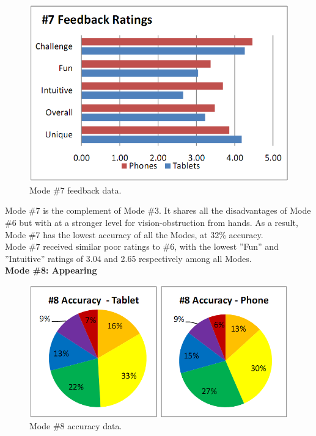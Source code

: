 \documentclass{sig-alternate}
\begin{document}
\begin{figure}[htb!]
	\begin{center}
		\includegraphics[width=1\linewidth]{figure_chart_rating_7}
	\end{center}
	\vspace{-12pt}
	\caption{Mode \#7 feedback data.}
	\label{fig:chart_rating_7}
\end{figure}

Mode \#7 is the complement of Mode \#3. It shares all the disadvantages of Mode \#6 but with at a stronger level for vision-obstruction from hands. As a result, Mode \#7 has the lowest accuracy of all the Modes, at 32\% accuracy. \\

Mode \#7 received similar poor ratings to \#6, with the lowest ''Fun'' and ''Intuitive'' ratings of 3.04 and 2.65 respectively among all Modes. \\

\newpage
\noindent \textbf{Mode \#8: Appearing}

\begin{figure}[htb!]
	\begin{center}
		\includegraphics[width=1\linewidth]{figure_chart_accuracy_8}
	\end{center}
	\vspace{-12pt}
	\caption{Mode \#8 accuracy data.}
	\label{fig:chart_accuracy_8}
\end{figure}
\end{document}
